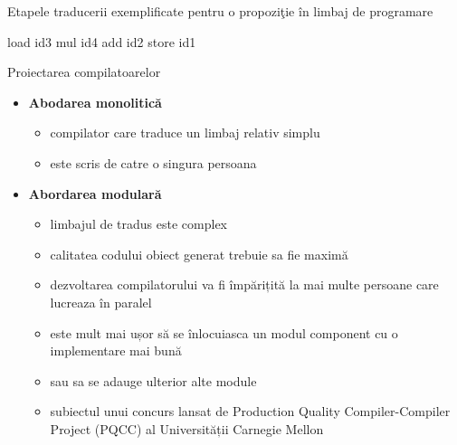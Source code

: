 \documentclass[pdf]{beamer}
\begin{document}
\begin{frame}{Etapele traducerii exemplificate pentru o propoziţie în limbaj de programare}
\begin{center}
load \- \- \- \- \- \- \- id3 
\newline
mul \- \- \- \- \- \- \- \-  id4
\newline
add \- \- \- \- \- \- \- \-  id2
\newline
store  \- \- \- \- \-  \- \- id1
\newline
\end{center}
\end{frame}



\begin{frame}{Proiectarea compilatoarelor}
\begin{itemize}
\item
\textbf{Abodarea monolitică}

\begin{itemize}
\item
compilator care traduce un limbaj relativ simplu
\item
este scris de catre o singura persoana
\end{itemize}

\item
\textbf{Abordarea modulară}

\begin{itemize}
\item
limbajul de tradus este complex
\item
calitatea codului obiect generat trebuie sa fie maximă
\item
dezvoltarea compilatorului va fi împărițită la mai multe persoane care lucreaza în paralel
\item
este mult mai ușor să se înlocuiasca un modul component cu o implementare mai bună
\item
sau sa se adauge ulterior alte module
\item
subiectul unui concurs lansat de Production Quality Compiler-Compiler Project (PQCC) al Universității Carnegie Mellon
\end{itemize}
\end{itemize}
\end{frame}
\end{document}
